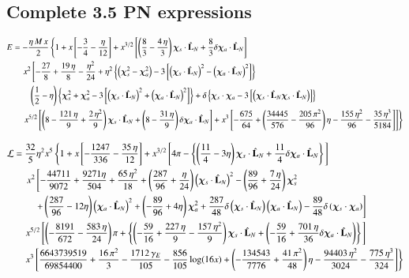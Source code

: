 \documentclass[prd,preprintnumbers,twocolumn,eqsecnum,floatfix,letter]{revtex4}
\begin{document}
\begin{widetext}
\section{Complete 3.5 PN expressions}

\begin{align}\label{eq:Ef}
E&=-\frac{\eta \, M \, x}{2}\left\{1 + x \left[-\frac{3}{4}-\frac{\eta}{12}\right] + x^{3/2}\left[\left(\frac{8}{3} - \frac{4 \, \eta}{3}\right)\bm{\chi}_s \cdot \hat{\mathbf{L}}_N + \frac{8}{3}\delta\bm{\chi}_a \cdot \hat{\mathbf{L}}_N\right]\right. \nonumber \\
& \quad \left. x^2\left[-\frac{27}{8} + \frac{19 \, \eta}{8}-\frac{\eta^2}{24} + \eta^2 \left\{\left(\bm{\chi}_s^2-\bm{\chi}_a^2\right) -3\left[\left(\bm{\chi}_s \cdot \hat{\mathbf{L}}_N\right)^2 - \left(\bm{\chi}_a \cdot \hat{\mathbf{L}}_N\right)^2\right]\right\}\right.\right. \nonumber \\
& \qquad \left(\frac{1}{2}-\eta\right)\left\{\bm{\chi}_s^2+\bm{\chi}_a^2-3\left[\left(\bm{\chi}_s \cdot \hat{\mathbf{L}}_N\right)^2+\left(\bm{\chi}_a \cdot \hat{\mathbf{L}}_N\right)^2\right]\right\}+\delta\left\{\bm{\chi}_s \cdot \bm{\chi}_a-3\left[\left(\bm{\chi}_s \cdot \hat{\mathbf{L}}_N\bm{\chi}_s \cdot \hat{\mathbf{L}}_N\right)\right]\right\} \nonumber\\
& \quad \left.\left.x^{5/2}\left[\left(8-\frac{121\,\eta}{9} +  \frac{2\,\eta^2}{9}\right)\bm{\chi}_s \cdot \hat{\mathbf{L}}_N + \left(8-\frac{31\,\eta}{9}\right)\delta\bm{\chi}_a \cdot \hat{\mathbf{L}}_N\right] + x^3\left[-\frac{675}{64}+\left(\frac{34445}{576}-\frac{205\,\pi^2}{96}\right)\eta-\frac{155\,\eta^2}{96}-\frac{35\,\eta^3}{5184}\right]
\right]
\right\}
\end{align}

\begin{align}\label{eq:Ff}
\mathcal{L}&=\frac{32}{5}\eta^2x^5\left\{1 + x\left[-\frac{1247}{336}-\frac{35\,\eta}{12}\right] + x^{3/2}\left[4\pi-\left\{\left(\frac{11}{4}-3\eta\right)\bm{\chi}_s \cdot \hat{\mathbf{L}}_N +\frac{11}{4}\delta\bm{\chi}_a \cdot \hat{\mathbf{L}}_N\right\}\right.\right]\nonumber\\
&\quad \left.\left. x^2\left[-\frac{44711}{9072}+\frac{9271\eta}{504}+\frac{65\, \eta^2}{18} + \left(\frac{287}{96} +\frac{\eta}{24}\right)\left(\bm{\chi}_s \cdot \hat{\mathbf{L}}_N\right)^2-\left(\frac{89}{96}+\frac{7\,\eta}{24}\right)\bm{\chi}_s^2\right.\right.\right.\nonumber\\
&\qquad\left.\left.\left. + \left(\frac{287}{96}-12\eta\right)\left(\bm{\chi}_a \cdot \hat{\mathbf{L}}_N\right)^2 + \left(-\frac{89}{96}+4\eta\right)\bm{\chi}_a^2 + \frac{287}{48}\delta\left(\bm{\chi}_s \cdot \hat{\mathbf{L}}_N\right)\left(\bm{\chi}_a \cdot \hat{\mathbf{L}}_N\right) -\frac{89}{48}\delta\left(\bm{\chi}_s \cdot \bm{\chi}_a\right)\right]\right.\right.\nonumber\\
&\quad \left.x^{5/2}\left[\left(-\frac{8191}{672}-\frac{583\,\eta}{24}\right)\pi+\left\{\left(-\frac{59}{16}+\frac{227\, \eta}{9}-\frac{157\, \eta^2}{9}\right)\bm{\chi}_s \cdot \hat{\mathbf{L}}_N + \left(-\frac{59}{16} + \frac{701\,\eta}{36}\delta\bm{\chi}_a \cdot \hat{\mathbf{L}}_N\right)\right\}\right.\right]\nonumber\\&\quad \left. x^3\left[\frac{6643739519}{69854400}+\frac{16\,\pi^2}{3}-\frac{1712\,\gamma_E}{105}-\frac{856}{105}\log(16x)+\left(-\frac{134543}{7776}+\frac{41\,\pi^2}{48}\right)\eta -\frac{94403\,\eta^2}{3024}-\frac{775\,\eta^3}{324}
\right]\right\}
\end{align}


\end{widetext}
\end{document}
